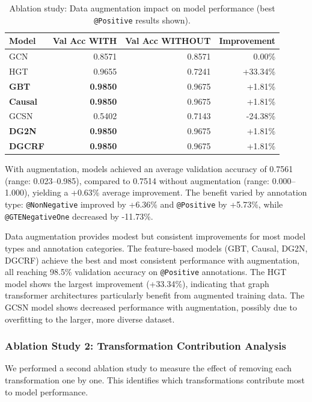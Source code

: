\documentclass[acmsmall,screen,review,anonymous]{acmart}
\makeatletter
\newcommand{\atmark}[1]{\texttt{@#1}}
\makeatother
\begin{document}
\begin{table}[t]
\caption{Ablation study: Data augmentation impact on model performance (best \atmark{Positive} results shown).}
\label{tab:ablation1}
\begin{tabular}{lrrr}
\toprule
\textbf{Model} & \textbf{Val Acc WITH} & \textbf{Val Acc WITHOUT} & \textbf{Improvement} \\
\midrule
GCN & 0.8571 & 0.8571 & 0.00\% \\
HGT & 0.9655 & 0.7241 & +33.34\% \\
\textbf{GBT} & \textbf{0.9850} & 0.9675 & +1.81\% \\
\textbf{Causal} & \textbf{0.9850} & 0.9675 & +1.81\% \\
GCSN & 0.5402 & 0.7143 & -24.38\% \\
\textbf{DG2N} & \textbf{0.9850} & 0.9675 & +1.81\% \\
\textbf{DGCRF} & \textbf{0.9850} & 0.9675 & +1.81\% \\
\bottomrule
\end{tabular}
\end{table}

With augmentation, models achieved an average validation accuracy of 0.7561 (range: 0.023--0.985), compared to 0.7514 without augmentation (range: 0.000--1.000), yielding a +0.63\% average improvement. The benefit varied by annotation type: \atmark{NonNegative} improved by +6.36\% and \atmark{Positive} by +5.73\%, while \atmark{GTENegativeOne} decreased by -11.73\%.

Data augmentation provides modest but consistent improvements for most model types and annotation categories. The feature-based models (GBT, Causal, DG2N, DGCRF) achieve the best and most consistent performance with augmentation, all reaching 98.5\% validation accuracy on \atmark{Positive} annotations. The HGT model shows the largest improvement (+33.34\%), indicating that graph transformer architectures particularly benefit from augmented training data. The GCSN model shows decreased performance with augmentation, possibly due to overfitting to the larger, more diverse dataset.

\subsubsection{Ablation Study 2: Transformation Contribution Analysis}
\label{sec:ablation2}

We performed a second ablation study to measure the effect of removing each transformation one by one. This identifies which transformations contribute most to model performance.
\end{document}
